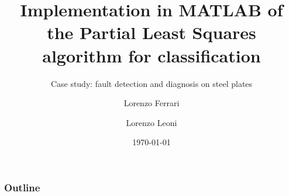 \documentclass{beamer}
\title[Implementation of the PLS algorithm]{Implementation in MATLAB of the Partial Least Squares algorithm for classification}
\subtitle{Case study: fault detection and diagnosis on steel plates}
\author[L. Ferrari, L. Leoni]{Lorenzo Ferrari \and Lorenzo Leoni}
\institute[University of Bergamo]{ Department of Engineering and Applied Sciences, University of Bergamo}
\date{\today}
\begin{document}
	
	\begin{frame}
		\titlepage
	\end{frame}

	\begin{frame}
		\frametitle{Outline}
		\tableofcontents
	\end{frame}
	
	
	
	
	
	
\end{document}
